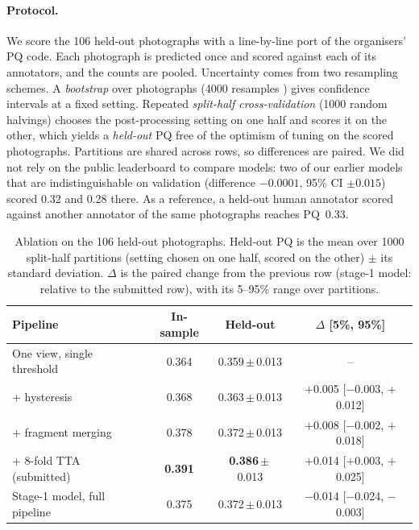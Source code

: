 \documentclass[sigconf]{acmart}
\begin{document}
\paragraph{Protocol.}
We score the 106 held-out photographs with a line-by-line port of the organisers' PQ code. Each photograph is predicted once and scored against each of its annotators, and the counts are pooled. Uncertainty comes from two resampling schemes. A \emph{bootstrap} over photographs (4000 resamples \cite{efron1993bootstrap}) gives confidence intervals at a fixed setting. Repeated \emph{split-half cross-validation} (1000 random halvings) chooses the post-processing setting on one half and scores it on the other, which yields a \emph{held-out} PQ free of the optimism of tuning on the scored photographs. Partitions are shared across rows, so differences are paired. We did not rely on the public leaderboard to compare models: two of our earlier models that are indistinguishable on validation (difference $-0.0001$, 95\% CI $\pm0.015$) scored 0.32 and 0.28 there. As a reference, a held-out human annotator scored against another annotator of the same photographs reaches PQ~0.33.

\begin{table}[t]
  \caption{Ablation on the 106 held-out photographs. Held-out PQ is the mean over 1000 split-half partitions (setting chosen on one half, scored on the other) $\pm$ its standard deviation. $\Delta$ is the paired change from the previous row (stage-1 model: relative to the submitted row), with its 5--95\% range over partitions.}
  \label{tab:ablation}
  \footnotesize\setlength{\tabcolsep}{3pt}
  \begin{tabular}{@{}lccc@{}}
    \toprule
    Pipeline & In-sample & Held-out & $\Delta$ [5\%, 95\%] \\
    \midrule
    One view, single threshold & 0.364 & 0.359\,$\pm$\,0.013 & -- \\
    \;+ hysteresis             & 0.368 & 0.363\,$\pm$\,0.013 & $+$0.005 [$-$0.003, $+$0.012] \\
    \;+ fragment merging       & 0.378 & 0.372\,$\pm$\,0.013 & $+$0.008 [$-$0.002, $+$0.018] \\
    \;+ 8-fold TTA (submitted) & \textbf{0.391} & \textbf{0.386}\,$\pm$\,0.013 & $+$0.014 [$+$0.003, $+$0.025] \\
    \midrule
    Stage-1 model, full pipeline & 0.375 & 0.372\,$\pm$\,0.013 & $-$0.014 [$-$0.024, $-$0.003] \\
    \bottomrule
  \end{tabular}
\end{table}
\end{document}
